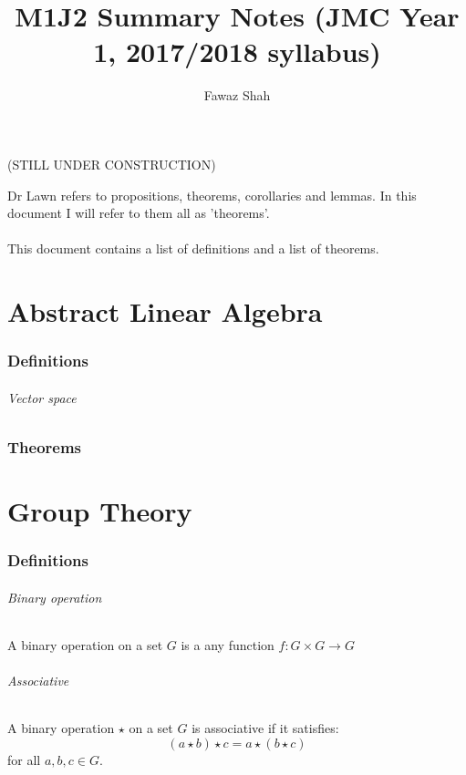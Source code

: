 \documentclass{article}
\title{M1J2 Summary Notes (JMC Year 1, 2017/2018 syllabus)}
\date{}
\author{Fawaz Shah}
\begin{document}
\large
\maketitle
\begin{center}
(STILL UNDER CONSTRUCTION)
\end{center}
\noindent Dr Lawn refers to propositions, theorems, corollaries and lemmas. In this document I will refer to them all as 'theorems'.
\\\\
\noindent This document contains a list of definitions and a list of theorems.
\tableofcontents
\newpage
\part{Abstract Linear Algebra}

\section{Definitions}
\paragraph{Vector space}

\section{Theorems}

\newpage
\part{Group Theory}

\section{Definitions}
\paragraph{Binary operation}
A binary operation on a set $ G $ is a any function $ f: G \times G \to G $
\paragraph{Associative}
A binary operation $ \star $ on a set $ G $ is associative if it satisfies:
\begin{equation}
(a \star b) \star c = a \star (b \star c)
\end{equation}
for all $ a, b, c \in G $.
\end{document}
